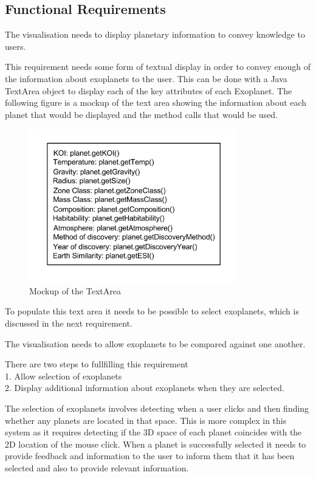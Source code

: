 \subsection{Functional Requirements}
\begin{enumerate}

{\bf
 \item[R1.] The visualisation needs to display planetary information to convey
knowledge to users.
}

  This requirement needs some form of textual display in order to convey enough
of the information about exoplanets to the user. This can be done with a Java
TextArea object to display each of the key
attributes of each Exoplanet. The following figure is a mockup of the text area
showing the information about each planet that would be displayed and the method
calls that would be used.

\begin{figure}[H]
  \centering
      \includegraphics[width=0.8\textwidth]{images/textAreaMockup.png}
  \caption{Mockup of the TextArea}  
\end{figure}

To populate this text area it needs to be possible to select exoplanets, which
is discussed in the next requirement.
\clearpage
{\bf
 \item[R2.] The visualisation needs to allow exoplanets to be compared against
one another.}

There are two steps to fullfilling this requirement\\ 1. Allow selection of
exoplanets \\ 2. Display additional information about exoplanets when they are
selected.

The selection of exoplanets involves detecting when a user clicks and then
finding whether any planets are
located in that space. This is more complex in this system as it requires
detecting if the 3D space of each planet coincides with the 2D
location of the mouse click. When a planet is successfully selected it needs to
provide feedback and
information to the user to inform them that it has been selected and also to
provide relevant information.


\end{enumerate}

